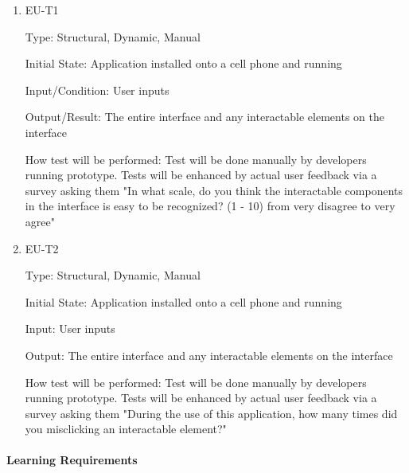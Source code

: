 \documentclass[12pt, titlepage]{article}
\begin{document}
\begin{enumerate}

\item{EU-T1\\}

Type: Structural, Dynamic, Manual
					
Initial State: Application installed onto a cell phone and running
					
Input/Condition: User inputs
					
Output/Result: The entire interface and any interactable elements on the interface
					
How test will be performed: Test will be done manually by developers running prototype. Tests will be enhanced by actual user feedback via a survey asking them "In what scale, do you think the interactable components in the interface is easy to be recognized? (1 - 10) from very disagree to very agree"
					
\item{EU-T2\\}

Type: Structural, Dynamic, Manual
					
Initial State: Application installed onto a cell phone and running
					
Input: User inputs
					
Output: The entire interface and any interactable elements on the interface
					
How test will be performed: Test will be done manually by developers running prototype. Tests will be enhanced by actual user feedback via a survey asking them "During the use of this application, how many times did you misclicking an interactable element?"

\end{enumerate}

\paragraph{Learning Requirements}
\end{document}
